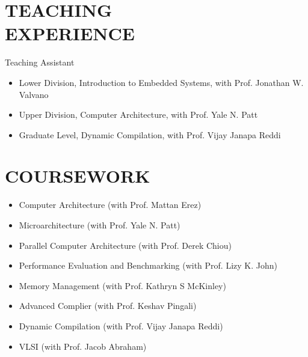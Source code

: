 \documentclass[margin, 9pt]{res} %
\begin{document}
\begin{resume}

\section{TEACHING\\ EXPERIENCE} 

{\large{Teaching Assistant}}\\
\vspace*{-5pt}
\begin{itemize}[leftmargin=*] \itemsep -2pt
\vspace*{-5pt}
	\item Lower Division, Introduction to Embedded Systems, with Prof. Jonathan W. Valvano
	\item Upper Division, Computer Architecture, with Prof. Yale N. Patt
	\item Graduate Level, Dynamic Compilation, with Prof. Vijay Janapa Reddi
\end{itemize}


\section{COURSEWORK} 

\vspace*{-2pt}
\begin{itemize}[leftmargin=*] \itemsep -2pt
	\item Computer Architecture (with Prof. Mattan Erez)
	\item Microarchitecture (with Prof. Yale N. Patt)
	\item Parallel Computer Architecture (with Prof. Derek Chiou)
	\item Performance Evaluation and Benchmarking (with Prof. Lizy K. John)
	\item Memory Management (with Prof. Kathryn S McKinley)
	\item Advanced Complier (with Prof. Keshav Pingali)
	\item Dynamic Compilation (with Prof. Vijay Janapa Reddi)
	\item VLSI (with Prof. Jacob Abraham)
\end{itemize}


\end{resume}
\end{document}
